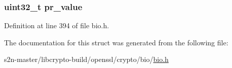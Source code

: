 \subsubsection[{\texorpdfstring{pr\+\_\+value}{pr_value}}]{\setlength{\rightskip}{0pt plus 5cm}uint32\+\_\+t pr\+\_\+value}\hypertarget{structbio__dgram__sctp__prinfo_ab2d793ab7f915461b1d30205c316d8b1}{}\label{structbio__dgram__sctp__prinfo_ab2d793ab7f915461b1d30205c316d8b1}


Definition at line 394 of file bio.\+h.



The documentation for this struct was generated from the following file\+:\begin{DoxyCompactItemize}
\item 
s2n-\/master/libcrypto-\/build/openssl/crypto/bio/\hyperlink{crypto_2bio_2bio_8h}{bio.\+h}\end{DoxyCompactItemize}
